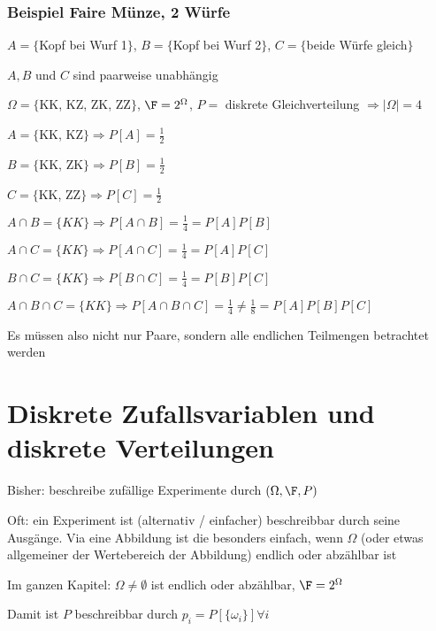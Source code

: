 \subsubsection{Beispiel Faire Münze, 2 Würfe}
\enumstart
	\item $A = \{$Kopf bei Wurf 1$\}$, $B = \{$Kopf bei Wurf 2$\}$, $C = \{$beide Würfe gleich$\}$
	\item $A,B$ und $C$ sind paarweise unabhängig
	\item $\Omega = \{$KK, KZ, ZK, ZZ$\}$, $\F = 2^\Omega$, $P =$ diskrete Gleichverteilung $\Rightarrow |\Omega| = 4$
	\item $A = \{$KK, KZ$\} \Rightarrow P[A] = \frac{1}{2}$
	\item $B = \{$KK, ZK$\} \Rightarrow P[B] = \frac{1}{2}$
	\item $C = \{$KK, ZZ$\} \Rightarrow P[C] = \frac{1}{2}$
	\item $A \cap B = \{KK\} \Rightarrow P[A \cap B] = \frac{1}{4} = P[A]P[B]$
	\item $A \cap C = \{KK\} \Rightarrow P[A \cap C] = \frac{1}{4} = P[A]P[C]$
	\item $B \cap C = \{KK\} \Rightarrow P[B \cap C] = \frac{1}{4} = P[B]P[C]$
	\item $A \cap B \cap C = \{KK\} \Rightarrow P[A \cap B \cap C] = \frac{1}{4} \ne \frac{1}{8} = P[A]P[B]P[C]$
	\item Es müssen also nicht nur Paare, sondern alle endlichen Teilmengen betrachtet werden
\enumend

\section{Diskrete Zufallsvariablen und diskrete Verteilungen}
\enumstart
	\item Bisher: beschreibe zufällige Experimente durch $(\Omega, \F, P)$
	\item Oft: ein Experiment ist (alternativ / einfacher) beschreibbar durch seine Ausgänge. Via eine Abbildung ist die besonders einfach, wenn $\Omega$ (oder etwas allgemeiner der Wertebereich der Abbildung) endlich oder abzählbar ist
	\item Im ganzen Kapitel: $\Omega \ne \emptyset$ ist endlich oder abzählbar, $\F = 2^\Omega$
	\item Damit ist $P$ beschreibbar durch $p_i = P[\{\omega_i\}] \forall i$
\enumend

